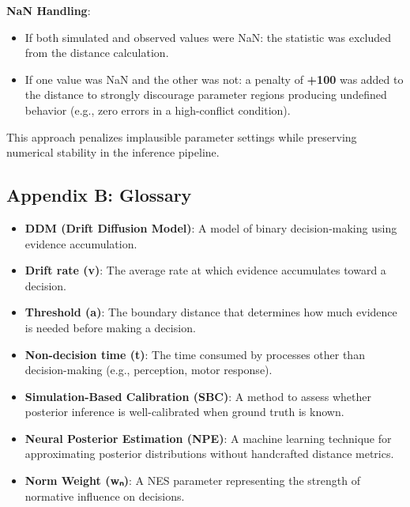 \documentclass[
  11pt,
]{article}
\providecommand{\tightlist}{%
  \setlength{\itemsep}{0pt}\setlength{\parskip}{0pt}}
\begin{document}
\textbf{NaN Handling}:

\begin{itemize}
\tightlist
\item
  If both simulated and observed values were NaN: the statistic was
  excluded from the distance calculation.
\item
  If one value was NaN and the other was not: a penalty of \textbf{+100}
  was added to the distance to strongly discourage parameter regions
  producing undefined behavior (e.g., zero errors in a high-conflict
  condition).
\end{itemize}

This approach penalizes implausible parameter settings while preserving
numerical stability in the inference pipeline.

\subsection{Appendix B: Glossary}\label{appendix-b-glossary}

\begin{itemize}
\item
  \textbf{DDM (Drift Diffusion Model)}: A model of binary
  decision-making using evidence accumulation.
\item
  \textbf{Drift rate (v)}: The average rate at which evidence
  accumulates toward a decision.
\item
  \textbf{Threshold (a)}: The boundary distance that determines how much
  evidence is needed before making a decision.
\item
  \textbf{Non-decision time (t)}: The time consumed by processes other
  than decision-making (e.g., perception, motor response).
\item
  \textbf{Simulation-Based Calibration (SBC)}: A method to assess
  whether posterior inference is well-calibrated when ground truth is
  known.
\item
  \textbf{Neural Posterior Estimation (NPE)}: A machine learning
  technique for approximating posterior distributions without
  handcrafted distance metrics.
\item
  \textbf{Norm Weight (wₙ)}: A NES parameter representing the strength
  of normative influence on decisions.
\end{itemize}

\printbibliography
\end{document}
